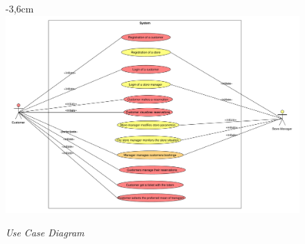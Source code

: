 \documentclass{article}
\begin{document}
		\begin{figure}[!htb]
			\begin{adjustwidth} {-3,6cm}{}
				\centering
				\includegraphics[scale=0.42]{UC/1_useCaseDiagram.pdf}\\
				\caption{\emph{Use Case Diagram}}
			\end{adjustwidth}
			
		\end{figure}
		\newpage
\end{document}
